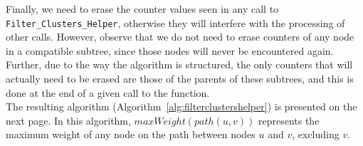 \documentclass{article}
\begin{document}
    Finally, we need to erase the counter values seen in any call to \texttt{Filter\_Clusters\_Helper}, otherwise they will interfere with the processing of other calls. However, observe that we do not need to erase counters of any node in a compatible subtree, since those nodes will never be encountered again. Further, due to the way the algorithm is structured, the only counters that will actually need to be erased are those of the parents of these subtrees, and this is done at the end of a given call to the function.\\

    The resulting algorithm (Algorithm~\ref{alg:filterclustershelper}) is presented on the next page. In this algorithm, $maxWeight(path(u, v))$ represents the maximum weight of any node on the path between nodes $u$ and $v$, excluding $v$.
\end{document}
